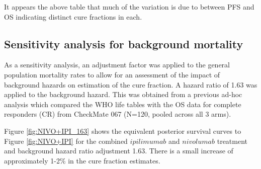 \documentclass[
]{article}
\begin{document}
It appears the above table that much of the variation is due to between
PFS and OS indicating distinct cure fractions in each.

\hypertarget{sensitivity-analysis-for-background-mortality}{%
\subsection{Sensitivity analysis for background
mortality}\label{sensitivity-analysis-for-background-mortality}}

As a sensitivity analysis, an adjustment factor was applied to the
general population mortality rates to allow for an assessment of the
impact of background hazards on estimation of the cure fraction. A
hazard ratio of 1.63 was applied to the background hazard. This was
obtained from a previous ad-hoc analysis which compared the WHO life
tables with the OS data for complete responders (CR) from CheckMate 067
(N=120, pooled across all 3 arms).

Figure \ref{fig:NIVO+IPI_163} shows the equivalent posterior survival
curves to Figure \ref{fig:NIVO+IPI} for the combined \(ipilimumab\) and
\(nivolumab\) treatment and background hazard ratio adjustment 1.63.
There is a small increase of approximately 1-2\% in the cure fraction
estimates.
\end{document}

